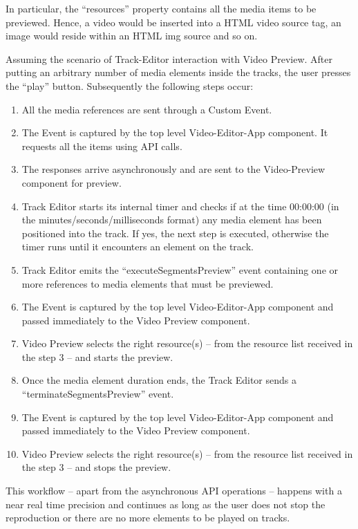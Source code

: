 In particular, the “resources” property contains all the media items to be previewed. Hence, a video would be inserted into a HTML video source tag, an image would reside within an HTML img source and so on.

Assuming the scenario of Track-Editor interaction with Video Preview. After putting an arbitrary number of media elements inside the tracks, the user presses the “play” button. Subsequently the following steps occur:

\begin{enumerate}
  \item All the media references are sent through a Custom Event.
  \item The Event is captured by the top level Video-Editor-App component. It requests all the items using API calls.
  \item The responses arrive asynchronously and are sent to the Video-Preview component for preview.
  \item Track Editor starts its internal timer and checks if at the time 00:00:00 (in the minutes/seconds/milliseconds format) any media element has been positioned into the track. If yes, the next step is executed, otherwise the timer runs until it encounters an element on the track.
  \item Track Editor emits the “executeSegmentsPreview” event containing one or more references to media elements that must be previewed.
  \item The Event is captured by the top level Video-Editor-App component and passed immediately to the Video Preview component.
  \item Video Preview selects the right resource(s) – from the resource list received in the step 3 – and starts the preview.
  \item Once the media element duration ends, the Track Editor sends a “terminateSegmentsPreview” event.
  \item The Event is captured by the top level Video-Editor-App component and passed immediately to the Video Preview component.
  \item Video Preview selects the right resource(s) – from the resource list received in the step 3 – and stops the preview.
\end{enumerate}

This workflow – apart from the asynchronous API operations – happens with a near real time precision and continues as long as the user does not stop the reproduction or there are no more elements to be played on tracks.

